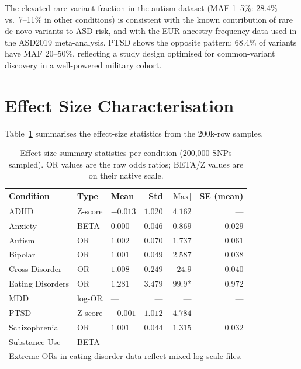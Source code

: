 \documentclass[11pt, a4paper]{article}
\begin{document}
The elevated rare-variant fraction in the autism dataset (MAF 1--5\%: 28.4\% vs.\
7--11\% in other conditions) is consistent with the known contribution of rare
de novo variants to ASD risk, and with the EUR ancestry frequency data used in
the ASD2019 meta-analysis. PTSD shows the opposite pattern: 68.4\% of variants
have MAF 20--50\%, reflecting a study design optimised for common-variant discovery
in a well-powered military cohort.

\section{Effect Size Characterisation}

Table~\ref{tab:effects} summarises the effect-size statistics from the 200k-row samples.

\begin{table}[H]
\centering
\caption{Effect size summary statistics per condition (200,000 SNPs sampled).
         OR values are the raw odds ratios; BETA/Z values are on their native scale.}
\label{tab:effects}
\begin{tabular}{lllrrr}
\toprule
Condition & Type & Mean & Std & $|\text{Max}|$ & SE (mean) \\
\midrule
ADHD           & Z-score & $-0.013$ & $1.020$ & $4.162$ & --- \\
Anxiety        & BETA    & $0.000$  & $0.046$ & $0.869$ & $0.029$ \\
Autism         & OR      & $1.002$  & $0.070$ & $1.737$ & $0.061$ \\
Bipolar        & OR      & $1.001$  & $0.049$ & $2.587$ & $0.038$ \\
Cross-Disorder & OR      & $1.008$  & $0.249$ & $24.9$  & $0.040$ \\
Eating Disorders & OR   & $1.281$  & $3.479$ & $99.9$* & $0.972$ \\
MDD            & log-OR  & ---      & ---     & ---     & --- \\
PTSD           & Z-score & $-0.001$ & $1.012$ & $4.784$ & --- \\
Schizophrenia  & OR      & $1.001$  & $0.044$ & $1.315$ & $0.032$ \\
Substance Use  & BETA    & ---      & ---     & ---     & --- \\
\midrule
\multicolumn{6}{l}{\small *Extreme ORs in eating-disorder data reflect mixed log-scale files.} \\
\bottomrule
\end{tabular}
\end{table}
\end{document}
